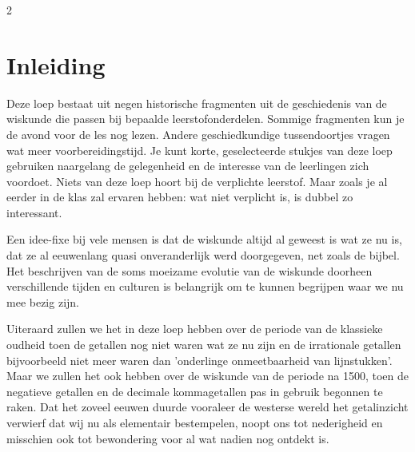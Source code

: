

\startcontents[inhoudloep]	%

\begin{multicols}{2}

    \inhoudstafelloep
	
	\section{Inleiding}
	 Deze loep bestaat uit negen historische fragmenten uit de geschiedenis van de wiskunde die passen bij bepaalde leerstofonderdelen. Sommige fragmenten kun je de avond voor de les nog lezen. Andere geschiedkundige tussendoortjes vragen wat meer voorbereidingstijd. Je kunt korte, geselecteerde stukjes van deze loep gebruiken naargelang de gelegenheid en de interesse van de leerlingen zich voordoet. Niets van deze loep hoort bij de verplichte leerstof. Maar zoals je al eerder in de klas zal ervaren hebben: wat niet verplicht is, is dubbel zo interessant.

    Een idee-fixe bij vele mensen is dat de wiskunde altijd al geweest is wat ze nu is, dat ze al eeuwenlang quasi onveranderlijk werd doorgegeven, net zoals de bijbel. Het beschrijven van de soms moeizame evolutie van de wiskunde doorheen verschillende tijden en culturen is belangrijk om te kunnen begrijpen waar we nu mee bezig zijn. 
    
    Uiteraard zullen we het in deze loep hebben over de periode van de klassieke oudheid toen de getallen nog niet waren wat ze nu zijn en de irrationale getallen bijvoorbeeld niet meer waren dan 'onderlinge onmeetbaarheid van lijnstukken'. Maar we zullen het ook hebben over de wiskunde van de periode na 1500, toen de negatieve getallen en de decimale kommagetallen pas in gebruik begonnen te raken. Dat het zoveel eeuwen duurde vooraleer de westerse wereld het getalinzicht verwierf dat wij nu als elementair bestempelen, noopt ons tot nederigheid en misschien ook tot bewondering voor al wat nadien nog ontdekt is. 


\end{multicols}
